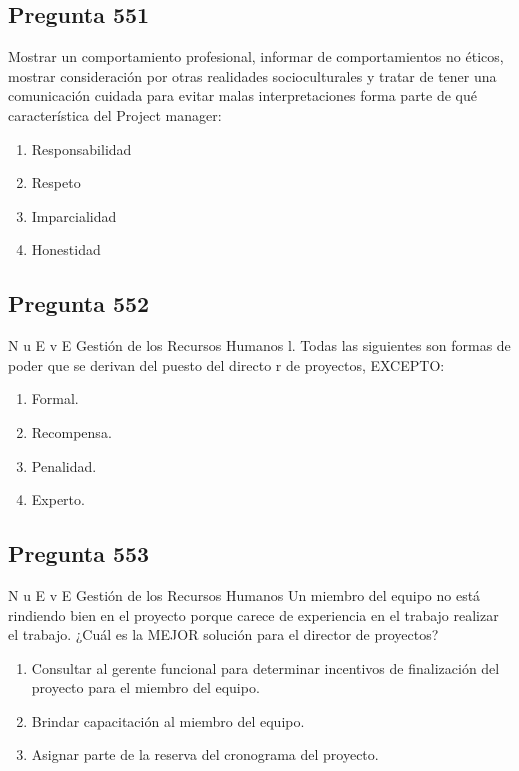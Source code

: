 \documentclass[11pt,a4paper]{article}
\begin{document}
\subsection*{Pregunta 551}
Mostrar un comportamiento profesional, informar de comportamientos no éticos, mostrar consideración por otras realidades socioculturales y tratar de tener una comunicación cuidada para evitar malas interpretaciones forma parte de qué característica del Project manager:

\begin{enumerate}[label=\alph*)]
  \item Responsabilidad
  \item Respeto
  \item Imparcialidad
  \item Honestidad
\end{enumerate}

\subsection*{Pregunta 552}
N u E v E Gestión de los Recursos Humanos l. Todas las siguientes son formas de poder que se derivan del puesto del directo r de proyectos, EXCEPTO:

\begin{enumerate}[label=\alph*)]
  \item Formal.
  \item Recompensa.
  \item Penalidad.
  \item Experto.
\end{enumerate}

\subsection*{Pregunta 553}
N u E v E Gestión de los Recursos Humanos Un miembro del equipo no está rindiendo bien en el proyecto porque carece de experiencia en el trabajo realizar el trabajo. ¿Cuál es la MEJOR solución para el director de proyectos?

\begin{enumerate}[label=\alph*)]
  \item Consultar al gerente funcional para determinar incentivos de finalización del proyecto para el miembro del equipo.
  \item Brindar capacitación al miembro del equipo.
  \item Asignar parte de la reserva del cronograma del proyecto.
\end{enumerate}
\end{document}
